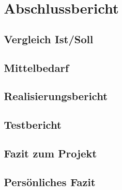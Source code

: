 \chapter{Abschlussbericht}
\section{Vergleich Ist/Soll}

\section{Mittelbedarf}

\section{Realisierungsbericht}

\section{Testbericht}

\section{Fazit zum Projekt}

\section{Persönliches Fazit}
